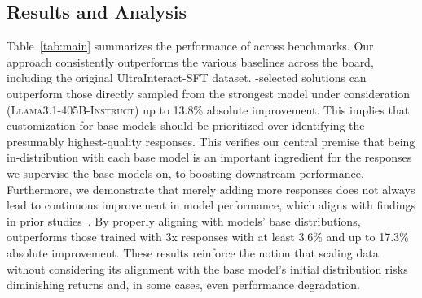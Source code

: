 



\subsection{Results and Analysis}
Table~\ref{tab:main} summarizes the performance of \name{} across benchmarks.
Our approach consistently outperforms the various baselines across the board, including the original UltraInteract-SFT dataset. \name-selected solutions can outperform those directly sampled from the strongest model under consideration (\textsc{Llama3.1-405B-Instruct}) up to 13.8\% absolute improvement. 
This implies that customization for base models should be prioritized over identifying the presumably highest-quality responses. This verifies our central premise that being in-distribution with each base model is an important ingredient for the responses we supervise the base models on, to boosting downstream performance.
Furthermore, we demonstrate that merely adding more responses does not always lead to continuous improvement in model performance, which aligns with findings in prior studies~\cite{li2024quantitytoqulality,du2023modsmodelorienteddataselection}. By properly aligning with models' base distributions, \name outperforms those trained with 3x responses with at least 3.6\% and up to 17.3\% absolute improvement. These results reinforce the notion that scaling data without considering its alignment with the base model's initial distribution risks diminishing returns and, in some cases, even performance degradation.


